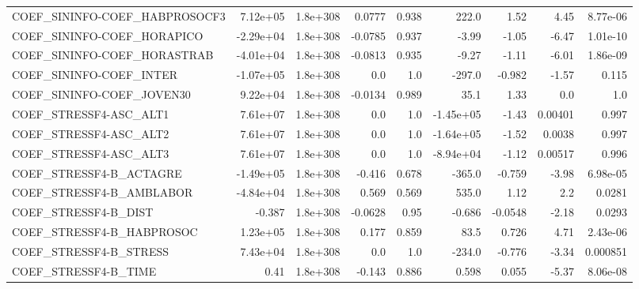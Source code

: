 \begin{tabular}{lrrrrrrrr}
COEF\_SININFO-COEF\_HABPROSOCF3     &    7.12e+05 &     1.8e+308 &  0.0777 &    0.938 &      222.0 &        1.52 &         4.45 &      8.77e-06 \\
COEF\_SININFO-COEF\_HORAPICO        &   -2.29e+04 &     1.8e+308 & -0.0785 &    0.937 &      -3.99 &       -1.05 &        -6.47 &      1.01e-10 \\
COEF\_SININFO-COEF\_HORASTRAB       &   -4.01e+04 &     1.8e+308 & -0.0813 &    0.935 &      -9.27 &       -1.11 &        -6.01 &      1.86e-09 \\
COEF\_SININFO-COEF\_INTER           &   -1.07e+05 &     1.8e+308 &     0.0 &      1.0 &     -297.0 &      -0.982 &        -1.57 &         0.115 \\
COEF\_SININFO-COEF\_JOVEN30         &    9.22e+04 &     1.8e+308 & -0.0134 &    0.989 &       35.1 &        1.33 &          0.0 &           1.0 \\
COEF\_STRESSF4-ASC\_ALT1            &    7.61e+07 &     1.8e+308 &     0.0 &      1.0 &  -1.45e+05 &       -1.43 &      0.00401 &         0.997 \\
COEF\_STRESSF4-ASC\_ALT2            &    7.61e+07 &     1.8e+308 &     0.0 &      1.0 &  -1.64e+05 &       -1.52 &       0.0038 &         0.997 \\
COEF\_STRESSF4-ASC\_ALT3            &    7.61e+07 &     1.8e+308 &     0.0 &      1.0 &  -8.94e+04 &       -1.12 &      0.00517 &         0.996 \\
COEF\_STRESSF4-B\_ACTAGRE           &   -1.49e+05 &     1.8e+308 &  -0.416 &    0.678 &     -365.0 &      -0.759 &        -3.98 &      6.98e-05 \\
COEF\_STRESSF4-B\_AMBLABOR          &   -4.84e+04 &     1.8e+308 &   0.569 &    0.569 &      535.0 &        1.12 &          2.2 &        0.0281 \\
COEF\_STRESSF4-B\_DIST              &      -0.387 &     1.8e+308 & -0.0628 &     0.95 &     -0.686 &     -0.0548 &        -2.18 &        0.0293 \\
COEF\_STRESSF4-B\_HABPROSOC         &    1.23e+05 &     1.8e+308 &   0.177 &    0.859 &       83.5 &       0.726 &         4.71 &      2.43e-06 \\
COEF\_STRESSF4-B\_STRESS            &    7.43e+04 &     1.8e+308 &     0.0 &      1.0 &     -234.0 &      -0.776 &        -3.34 &      0.000851 \\
COEF\_STRESSF4-B\_TIME              &        0.41 &     1.8e+308 &  -0.143 &    0.886 &      0.598 &       0.055 &        -5.37 &      8.06e-08 \\

\end{tabular}

